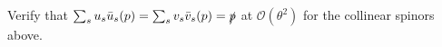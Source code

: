 \begin{subappendices}
\begin{exercise}
    Verify that \(\sum_s u_s \bar{u}_s (p) = \sum_s v_s \bar{v}_s (p) = \slashed{p}\) at \(\mathcal{O}(\theta^2)\) for the collinear spinors above.


\end{exercise}
\end{subappendices}
